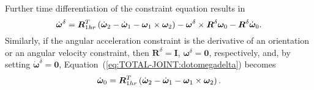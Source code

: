 \documentclass[10pt,dvips,fleqn,subeqn]{report}
\newcommand{\T}[1]{\bm{#1}}
\begin{document}
Further time differentiation of the constraint equation results in
\begin{equation}
	\dot{\T{\omega}}^{\delta}
	= \T{R}_{1hr}^T\plbr{
		\dot{\T{\omega}}_2
		- \dot{\T{\omega}}_1
		- \T{\omega}_1 \times \T{\omega}_2
	} - \T{\omega}^{\delta} \times \T{R}^{\delta} \T{\omega}_0
	- \T{R}^{\delta} \dot{\T{\omega}}_0 .
	\label{eq:TOTAL-JOINT:dotomegadelta}
\end{equation}
Similarly, if the angular acceleration constraint 
is the derivative of an orientation or an angular velocity constraint,
then $\T{R}^{\delta}=\T{I}$, $\T{\omega}^{\delta}=\T{0}$, respectively,
and, by setting $\dot{\T{\omega}}^{\delta}=\T{0}$,
Equation~(\ref{eq:TOTAL-JOINT:dotomegadelta}) becomes
\begin{equation}
	\dot{\T{\omega}}_0 = \T{R}_{1hr}^T\plbr{
		\dot{\T{\omega}}_2
		- \dot{\T{\omega}}_1
		- \T{\omega}_1 \times \T{\omega}_2
	} .
\end{equation}
\end{document}
